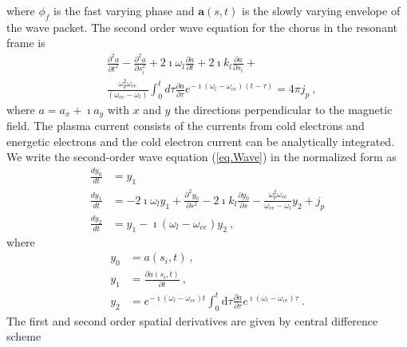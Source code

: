 where $\phi_f$ is the fast varying phase and $\mathbf{a}(s,t)$ is the slowly varying envelope of the wave packet. 
The second order wave equation for the chorus in the resonant frame  is 
\begin{equation}\label{eq.Wave}
    \begin{aligned}
        &\frac{\partial^2 a}{\partial t^2} - \frac{\partial^2 a}{\partial s_i^2} + {2\imath\omega_l}\frac{\partial a}{\partial t} + 2\imath k_l\frac{\partial a}{\partial s_i} + \\
        &\frac{\omega_p^2 \omega_{ce}}{(\omega_{ce}-\omega_l)} \int_0^t d \tau \frac{\partial a}{\partial \tau} e^{-\imath\left(\omega_l-\omega_{c e}\right)(t-\tau)} = {4\pi}j_p~,
        \end{aligned}
      \end{equation}
where 
$a = a_x + \imath a_y$ with $x$ and $y$ the directions 
perpendicular to the  magnetic field. The plasma current consists of the currents from cold electrons and energetic electrons and the cold electron current can be analytically integrated.
We write the second-order wave equation (\ref{eq.Wave}) in the normalized form as
\begin{equation}\label{eq.Wave2}
    \begin{aligned}
        \frac{d y_0}{d t} & =y_1 
        \\
        \frac{d y_1}{d t} & =-2 \imath \omega_l y_1+\frac{\partial^2 y_0}{\partial s^2}-2 \imath k_l \frac{\partial y_0}{\partial s}- \frac{\omega^2_p\omega_{ce}}{\omega_{ce}-\omega_l}y_{2} +j_p\\
        \frac{d y_2}{d t} & =y_1-\imath\left(\omega_l-\omega_{ce}\right) y_2~,
        \end{aligned}
\end{equation}
where 
\begin{equation}
    \begin{aligned}
        y_0 &= a(s_i,t)~,
        \\
        y_1 &= \frac{\partial a(s_i,t)}{\partial t}~,
        \\
        y_2 &= e^{-\imath(\omega_l-\omega_{ce})t} \int_0^t\mathrm{d}\tau \frac{\partial a}{\partial \tau} e^{\imath(\omega_l-\omega_{ce})\tau}~.
    \end{aligned}
\end{equation}
The first and second order spatial derivatives are given by central difference scheme
